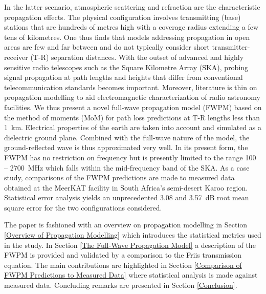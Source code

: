 \documentclass[10pt,journal,twoside]{IEEEtran}
\begin{document}
In the latter scenario, atmospheric scattering and refraction are the characteristic propagation effects. The physical configuration involves transmitting (base) stations that are hundreds of metres high with a coverage radius extending a few tens of kilometres. %
One thus finds that models addressing propagation in open areas are few and far between and do not typically consider short transmitter-receiver (T-R) separation distances. With the outset of advanced and highly sensitive radio telescopes such as the Square Kilometre Array (SKA), probing signal propagation at path lengths and heights that differ from conventional telecommunication standards becomes important. Moreover, literature is thin on propagation modelling to aid electromagnetic characterization of radio astronomy facilities. %
We thus present a novel full-wave propagation model (FWPM) based on the method of moments (MoM) for path loss predictions at T-R lengths less than \SI{1}{km}. Electrical properties of the earth are taken into account and simulated as a dielectric ground plane. Combined with the full-wave nature of the model, the ground-reflected wave is thus approximated very well. In its present form, the FWPM has no restriction on frequency but is presently limited to the range \SI{100}{} -- \SI{2700}{MHz} which falls within the mid-frequency band of the SKA. As a case study, comparisons of the FWPM predictions are made to measured data obtained at the  MeerKAT facility in South Africa's semi-desert Karoo region. Statistical error analysis yields an unprecedented \SI{3.08}{} and \SI{3.57}{dB} root mean square error for the two configurations considered.

The paper is fashioned with an overview on propagation modelling in Section \ref{Overview of Propagation Modelling} which introduces the statistical metrics used in the study. In Section \ref{The Full-Wave Propagation Model} a description of the FWPM is provided and validated by a comparison to the Friis transmission equation. The main contributions are highlighted in Section \ref{Comparison of FWPM Predictions to Measured Data} where statistical analysis is made against measured data. Concluding remarks are presented in Section \ref{Conclusion}.  
\end{document}
